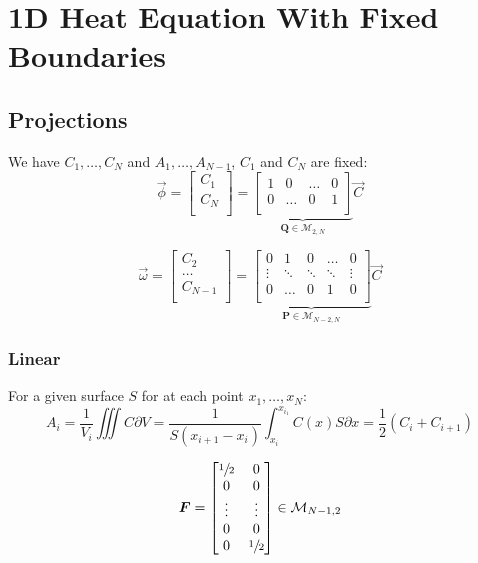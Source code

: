 \documentclass[aps,onecolumn,11pt]{revtex4}
\newcommand{\half}{{\sfrac{1}{2}}}
\newcommand{\mat}[1]{{\bm{#1}}}
\begin{document}
\section{1D Heat Equation With Fixed Boundaries}
\subsection{Projections}
We have $C_1,\ldots,C_N$ and $A_1,\ldots,A_{N-1}$, $C_1$ and $C_N$ are fixed:
\begin{equation}
	\vec{\phi}=
	\begin{bmatrix}
	C_1\\
	C_N\\
	\end{bmatrix}
	= 
	\underbrace{
	\begin{bmatrix}
	1 & 0 & \ldots & 0\\
 	0 & \ldots & 0 & 1\\
	\end{bmatrix}}_{\mat{Q} \in \mathcal{M}_{2,N}}
	\vec{C}
\end{equation}


\begin{equation}
	\vec{\omega}=
	\begin{bmatrix}
	C_2\\
	\ldots\\
	C_{N-1}\\
	\end{bmatrix}
	= 
	\underbrace{
	\begin{bmatrix}
	0 & 1 & 0 & \ldots & 0 \\
	\vdots & \ddots & \ddots & \ddots & \vdots \\
     0 & \ldots & 0 & 1 & 0\\
 	\end{bmatrix}}_{\mat{P} \in \mathcal{M}_{N-2,N}}
	\vec{C}
\end{equation}

\subsubsection{Linear}

For a given surface $S$ for at each point $x_1,\ldots,x_N$:
\begin{equation}
	A_i = \dfrac{1}{V_i} \iiint C \partial V = \dfrac{1}{S(x_{i+1}-x_i)} \int_{x_i}^{x_{i_1}} C(x) S \partial x = \dfrac{1}{2}\left(C_{i}+C_{i+1}\right)
\end{equation}


\begin{equation}
	\mat{F} = 
	\begin{bmatrix}
	\half & 0\\
	0     & 0\\
	\vdots & \vdots\\
	0      & 0\\
	0      & \half\\
	\end{bmatrix} \in \mathcal{M}_{N-1,2}
\end{equation}
\end{document}

